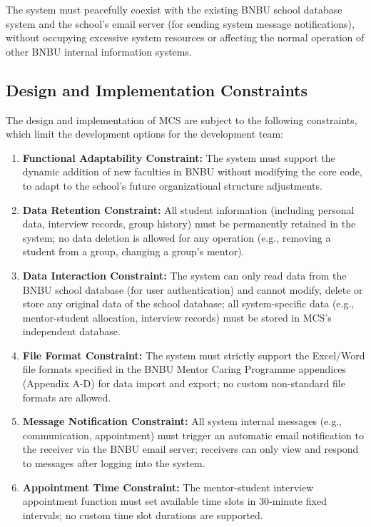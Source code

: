 The system must peacefully coexist with the existing BNBU school database system and the school's email server (for sending system message notifications), without occupying excessive system resources or affecting the normal operation of other BNBU internal information systems.

\subsection{Design and Implementation Constraints}

The design and implementation of MCS are subject to the following constraints, which limit the development options for the development team:

\begin{enumerate}
\item \textbf{Functional Adaptability Constraint:} The system must support the dynamic addition of new faculties in BNBU without modifying the core code, to adapt to the school's future organizational structure adjustments.
\item \textbf{Data Retention Constraint:} All student information (including personal data, interview records, group history) must be permanently retained in the system; no data deletion is allowed for any operation (e.g., removing a student from a group, changing a group's mentor).
\item \textbf{Data Interaction Constraint:} The system can only read data from the BNBU school database (for user authentication) and cannot modify, delete or store any original data of the school database; all system-specific data (e.g., mentor-student allocation, interview records) must be stored in MCS's independent database.
\item \textbf{File Format Constraint:} The system must strictly support the Excel/Word file formats specified in the BNBU Mentor Caring Programme appendices (Appendix A-D) for data import and export; no custom non-standard file formats are allowed.
\item \textbf{Message Notification Constraint:} All system internal messages (e.g., communication, appointment) must trigger an automatic email notification to the receiver via the BNBU email server; receivers can only view and respond to messages after logging into the system.
\item \textbf{Appointment Time Constraint:} The mentor-student interview appointment function must set available time slots in 30-minute fixed intervals; no custom time slot durations are supported.

\end{enumerate}
